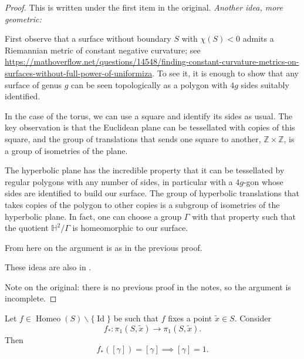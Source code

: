\begin{proof}
This is written under the first item in
the original. {\it Another idea, more
geometric:}

First observe that a surface without
boundary $S$ with $\chi(S)<0$ admits a
Riemannian metric of constant negative
curvature; see
\url{https://mathoverflow.net/questions/14548/finding-constant-curvature-metrics-on-surfaces-without-full-power-of-uniformiza}.
To see it, it is enough to show that any
surface of genus $g$ can be seen
topologically as a polygon with $4g$
sides suitably identified.

In the case of the torus, we can use a
square and identify its sides as usual.
The key observation is that the
Euclidean plane can be tessellated with
copies of this square, and the group of
translations that sends one square to
another, $\mathbb{Z}\times\mathbb{Z}$,
is a group of isometries of the plane.

The hyperbolic plane has the incredible
property that it can be tessellated by
regular polygons with any number of
sides, in particular with a $4g$-gon
whose sides are identified to build our
surface. The group of hyperbolic
translations that takes copies of the
polygon to other copies is a subgroup of
isometries of the hyperbolic plane. In
fact, one can choose a group $\Gamma$
with that property such that the
quotient $\mathbb{H}^2/\Gamma$ is
homeomorphic to our surface.

From here on the argument is as in the
previous proof.

These ideas are also in \cite{ler}.

Note on the original: there is no
previous proof in the notes, so the
argument is incomplete.
\end{proof}

\begin{lemma}
\label{lemma-fixed-class}
Let
$f\in\operatorname{Homeo}(S)
\backslash\{\operatorname{Id}\}$
be such that $f$ fixes a point
$\tilde{x}\in S$. Consider
$$
f_*:\pi_1(S,\tilde{x})\to
\pi_1(S,\tilde{x}).
$$
Then
$$
f_*([\gamma])=[\gamma]\implies
[\gamma]=1.
$$
\end{lemma}

